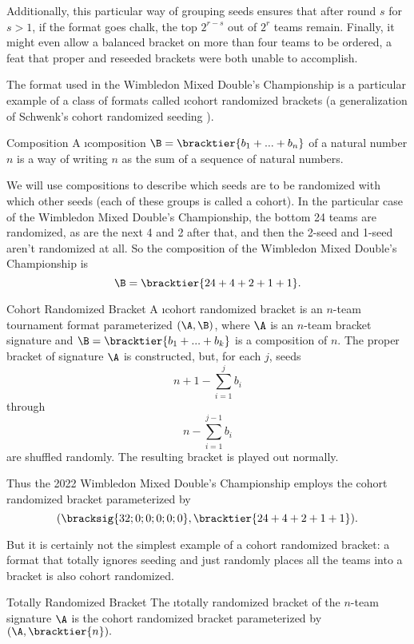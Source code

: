 {    Additionally, this particular way of grouping seeds ensures that after round $s$ for $s>1$, if the format goes chalk, the top $2^{r-s}$ out of $2^r$ teams remain. Finally, it might even allow a balanced bracket on more than four teams to be ordered, a feat that proper and reseeded brackets were both unable to accomplish.

    The format used in the Wimbledon Mixed Double's Championship is a particular example of a class of formats called \i{cohort randomized brackets} (a generalization of Schwenk's cohort randomized seeding \cite{randomized_cohort}).

    \begin{definition}{Composition}{}
        A \i{composition} $\B = \bracktier{b_1 + ... + b_n}$ of a natural number $n$ is a way of writing $n$ as the sum of a sequence of natural numbers.
    \end{definition}

    We will use compositions to describe which seeds are to be randomized with which other seeds (each of these groups is called a cohort). In the particular case of the Wimbledon Mixed Double's Championship, the bottom 24 teams are randomized, as are the next 4 and 2 after that, and then the 2-seed and 1-seed aren't randomized at all. So the composition of the Wimbledon Mixed Double's Championship is $$\B = \bracktier{24 + 4 + 2 + 1 + 1}.$$

    \begin{definition}{Cohort Randomized Bracket}{}
        A \i{cohort randomized bracket} is an $n$-team tournament format parameterized $(\A, \B)$, where $\A$ is an $n$-team bracket signature and $\B = \bracktier{b_1 + ... + b_k}$ is a composition of $n$. The proper bracket of signature $\A$ is constructed, but, for each $j$, seeds $$n + 1 - \sum_{i=1}^j b_i$$ through $$n - \sum_{i=1}^{j-1} b_i$$ are shuffled randomly. The resulting bracket is played out normally.
    \end{definition}

    Thus the 2022 Wimbledon Mixed Double's Championship employs the cohort randomized bracket parameterized by $$(\bracksig{32;0;0;0;0;0}, \bracktier{24 + 4 + 2 + 1 + 1}).$$ 

    But it is certainly not the simplest example of a cohort randomized bracket: a format that totally ignores seeding and just randomly places all the teams into a bracket is also cohort randomized. 
    
    \begin{definition}{Totally Randomized Bracket}{}
        The \i{totally randomized bracket} of the $n$-team signature $\A$ is the cohort randomized bracket parameterized by $(\A, \bracktier{n}).$
    \end{definition}

}
